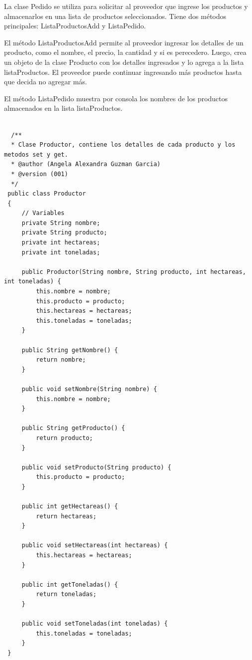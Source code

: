 \documentclass[10pt,a4paper]{article}
\def\StartLineAt#1{\lstset{firstnumber=#1}}
\begin{document}
La clase Pedido se utiliza para solicitar al proveedor que ingrese los productos y almacenarlos en una lista de productos seleccionados. Tiene dos métodos principales: ListaProductosAdd y ListaPedido.

El método ListaProductosAdd permite al proveedor ingresar los detalles de un producto, como el nombre, el precio, la cantidad y si es perecedero. Luego, crea un objeto de la clase Producto con los detalles ingresados y lo agrega a la lista listaProductos. El proveedor puede continuar ingresando más productos hasta que decida no agregar más.

El método ListaPedido muestra por consola los nombres de los productos almacenados en la lista listaProductos.

\StartLineAt{1}
\begin{lstlisting}[style=Java]

  /**
  * Clase Productor, contiene los detalles de cada producto y los metodos set y get.
  * @author (Angela Alexandra Guzman Garcia) 
  * @version (001)
  */
 public class Productor
 {
     // Variables
     private String nombre;
     private String producto;
     private int hectareas;
     private int toneladas;
     
     public Productor(String nombre, String producto, int hectareas, int toneladas) {
         this.nombre = nombre;
         this.producto = producto;
         this.hectareas = hectareas;
         this.toneladas = toneladas;
     }
      
     public String getNombre() {
         return nombre;
     }
     
     public void setNombre(String nombre) {
         this.nombre = nombre;
     }
     
     public String getProducto() {
         return producto;
     }
     
     public void setProducto(String producto) {
         this.producto = producto;
     }
     
     public int getHectareas() {
         return hectareas;
     }
     
     public void setHectareas(int hectareas) {
         this.hectareas = hectareas;
     }
     
     public int getToneladas() {
         return toneladas;
     }
     
     public void setToneladas(int toneladas) {
         this.toneladas = toneladas;
     }
 }
 
  
\end{lstlisting}
\end{document}
